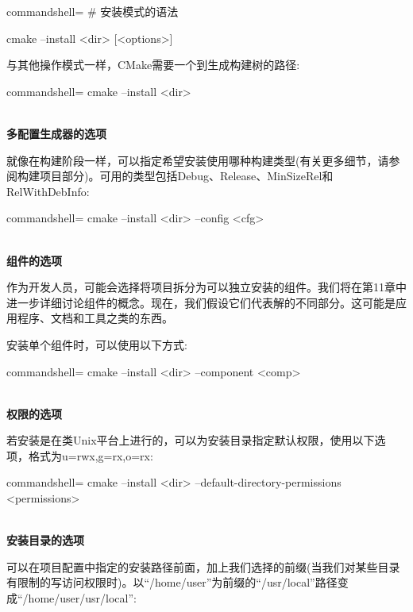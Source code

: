 \begin{tcblisting}{commandshell={}}
# 安装模式的语法

cmake --install <dir> [<options>]
\end{tcblisting}

与其他操作模式一样，CMake需要一个到生成构建树的路径:

\begin{tcblisting}{commandshell={}}
cmake --install <dir>
\end{tcblisting}

\hspace*{\fill} \\ %
\noindent
\textbf{多配置生成器的选项}

就像在构建阶段一样，可以指定希望安装使用哪种构建类型(有关更多细节，请参阅构建项目部分)。可用的类型包括Debug、Release、MinSizeRel和RelWithDebInfo:

\begin{tcblisting}{commandshell={}}
cmake --install <dir> --config <cfg>
\end{tcblisting}

\hspace*{\fill} \\ %
\noindent
\textbf{组件的选项}

作为开发人员，可能会选择将项目拆分为可以独立安装的组件。我们将在第11章中进一步详细讨论组件的概念。现在，我们假设它们代表解的不同部分。这可能是应用程序、文档和工具之类的东西。

安装单个组件时，可以使用以下方式:

\begin{tcblisting}{commandshell={}}
cmake --install <dir> --component <comp>
\end{tcblisting}

\hspace*{\fill} \\ %
\noindent
\textbf{权限的选项}

若安装是在类Unix平台上进行的，可以为安装目录指定默认权限，使用以下选项，格式为u=rwx,g=rx,o=rx:

\begin{tcblisting}{commandshell={}}
cmake --install <dir>
  --default-directory-permissions <permissions>
\end{tcblisting}

\hspace*{\fill} \\ %
\noindent
\textbf{安装目录的选项}

可以在项目配置中指定的安装路径前面，加上我们选择的前缀(当我们对某些目录有限制的写访问权限时)。以“/home/user”为前缀的“/usr/local”路径变成“/home/user/usr/local”:

